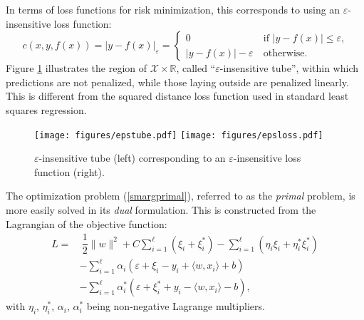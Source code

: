 \documentclass[12pt]{report}
\begin{document}
In terms of loss functions for risk minimization, this corresponds to using an $ \varepsilon $-insensitive loss function:
\begin{equation} \label{epsloss}
c(x,y,f(x)) = \vert y - f(x) \vert_{\varepsilon} = \begin{cases}
0 &\ \text{if } \vert y - f(x) \vert \leq \varepsilon \text{,}\\
\vert y - f(x) \vert - \varepsilon &\ \text{otherwise} \text{.}
\end{cases}
\end{equation}
Figure \ref{epstubefig} illustrates the region of $ \mathcal{X} \times \mathbb{R} $, called ``$ \varepsilon $-insensitive tube'', within which predictions are not penalized, while those laying outside are penalized linearly. This is different from the squared distance loss function used in standard least squares regression.

\begin{figure}[h]
  	\begin{adjustwidth}{-1in}{-1in}
  	\centering
  	\texttt{[image: figures/epstube.pdf]}
  	\qquad
  	\texttt{[image: figures/epsloss.pdf]}
  	\end{adjustwidth}
  \caption{$\varepsilon$-insensitive tube (left) corresponding to an $\varepsilon$-insensitive loss function (right).}
  \label{epstubefig}
\end{figure}

The optimization problem (\ref{smargprimal}), referred to as the \textit{primal} problem, is more easily solved in its \textit{dual} formulation. This is constructed from the Lagrangian of the objective function:
\begin{equation} \label{lagrangian}
\begin{split}
L =& \ \dfrac{1}{2}\| w \|^2 + C\sum_{i=1}^{\ell}(\xi_{i} + \xi_{i}^{*}) - \sum_{i=1}^{\ell}(\eta_{i}\xi_{i} + \eta_{i}^{*}\xi_{i}^{*}) \\
&- \sum_{i=1}^{\ell}\alpha_{i}(\varepsilon + \xi_{i} - y_{i} + \langle w,x_{i} \rangle + b) \\
&- \sum_{i=1}^{\ell}\alpha_{i}^{*}(\varepsilon + \xi_{i}^{*} + y_{i} - \langle w,x_{i} \rangle - b) \text{,}
\end{split}
\end{equation}
with $ \eta_{i} $, $ \eta_{i}^{*} $, $ \alpha_{i} $, $ \alpha_{i}^{*} $ being non-negative Lagrange multipliers.
\end{document}

